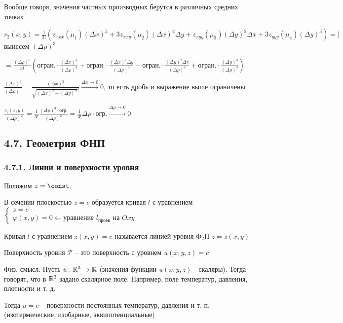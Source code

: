 \documentclass[12pt]{article}
\begin{document}
    Вообще говоря, значения частных производных берутся в различных средних точках

    $r_2(x, y) = \frac{1}{3!} (z_{xxx}(\mu_1)(\Delta x)^3 + 3 z_{xxy}(\mu_2)(\Delta x)^2 \Delta y + z_{xyy}(\mu_3)(\Delta y)^2 \Delta x + 3 z_{yyy}(\mu_4)(\Delta y)^3) = \Big|$ вынесем $(\Delta \rho)^3$

    $= \frac{(\Delta \rho)^3}{3!} \left(\text{огран.} \cdot \frac{(\Delta x)^3}{(\Delta \rho)^3} + \text{огран.} \cdot \frac{(\Delta x)^2 \Delta y}{(\Delta \rho)^3} + \text{огран.} \cdot \frac{(\Delta y)^2 \Delta x}{(\Delta \rho)^3} + \text{огран.} \cdot \frac{(\Delta y)^3}{(\Delta \rho)^3}\right)$

    $\frac{(\Delta x)^3}{(\Delta \rho)^3} = \frac{(\Delta x)^3}{\sqrt{(\Delta x)^2 + (\Delta y)^2}^3} \stackrel{\Delta x \to 0}{\rightarrow} 0$, то есть дробь и выражение выше ограничены

    $\frac{r_2(x, y)}{(\Delta \rho)^2} = \frac{1}{3!} \frac{(\Delta \rho)^3 \cdot \text{огр.}}{(\Delta \rho)^2} = \frac{1}{3!} \Delta \rho \cdot \text{огр.} \stackrel{\Delta \rho \to 0}{\rightarrow} 0$

    \subsection{4.7. Геометрия ФНП}


    \subsubsection{4.7.1. Линии и поверхности уровня}

    Положим $z = \const$.

    В сечении плоскостью $z = c$ образуется кривая $l$ с уравнением $\begin{cases}z = c \\ \varphi(x, y) = 0 \leftarrow \text{уравнение $l_\text{проек}$ на $Oxy$}\end{cases}$

    Кривая $l$ с уравнением $z(x, y) = c$ называется линией уровня Ф$_2$П $z = z(x, y)$

    \Def Поверхность уровня $\mathcal{P}$ -- это поверхность с уровнем $u(x, y, z) = c$

    Физ. смысл: Пусть $u : \mathbb{R}^3 \rightarrow \mathbb{R}$ (значения функции $u(x, y, z)$ - скаляры).
    Тогда говорят, что в $\mathbb{R}^3$ задано скалярное поле.
    Например, поле температур, давления, плотности и т. д.

    Тогда $u = c$ -- поверхности постоянных температур, давления и т. п. (изотермические, изобарные, эквипотенциальные)
\end{document}
